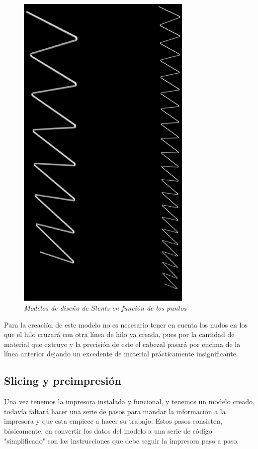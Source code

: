 \documentclass[a4paper,12pt]{article}
\begin{document}
	\begin{figure}[!ht]
	\begin{center}
	  \includegraphics[width=0.75\textwidth]{Figuras/modeloStents.eps}
	  \caption{\emph{Modelos de diseño de Stents en función de los puntos}}
	\end{center}
	\label{fig:modeloStents}
	\end{figure}

Para la creación de este modelo no es necesario tener en cuenta los nudos en los que el hilo cruzará con otra línea de hilo ya creada, pues por la cantidad de material que extruye y la precisión de este el cabezal pasará por encima de la línea anterior dejando un excedente de material prácticamente insignificante.\\


\subsection{Slicing y preimpresión}
Una vez tenemos la impresora instalada y funcional, y tenemos un modelo creado, todavía faltará hacer una serie de pasos para mandar la información a la impresora y que esta empiece a hacer su trabajo. Estos pasos consisten, básicamente, en convertir los datos del modelo a una serie de código "simplificado" con las instrucciones que debe seguir la impresora paso a paso.
\end{document}
